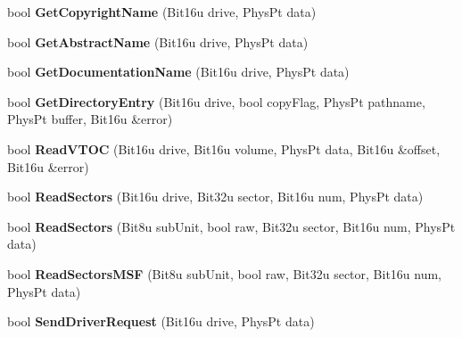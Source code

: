\begin{DoxyCompactItemize}
\item 
\hypertarget{classCMscdex_a359564a146117131092365623502a426}{bool {\bfseries Get\-Copyright\-Name} (Bit16u drive, Phys\-Pt data)}\label{classCMscdex_a359564a146117131092365623502a426}

\item 
\hypertarget{classCMscdex_a5a813cad2785de864459f65a49f4b146}{bool {\bfseries Get\-Abstract\-Name} (Bit16u drive, Phys\-Pt data)}\label{classCMscdex_a5a813cad2785de864459f65a49f4b146}

\item 
\hypertarget{classCMscdex_ae6209fad7716e1261f4ed7a15fe64026}{bool {\bfseries Get\-Documentation\-Name} (Bit16u drive, Phys\-Pt data)}\label{classCMscdex_ae6209fad7716e1261f4ed7a15fe64026}

\item 
\hypertarget{classCMscdex_a7af859df94d70eea08c953571a54ed36}{bool {\bfseries Get\-Directory\-Entry} (Bit16u drive, bool copy\-Flag, Phys\-Pt pathname, Phys\-Pt buffer, Bit16u \&error)}\label{classCMscdex_a7af859df94d70eea08c953571a54ed36}

\item 
\hypertarget{classCMscdex_ad0746c59d6eaee8c20d5267bec58a09b}{bool {\bfseries Read\-V\-T\-O\-C} (Bit16u drive, Bit16u volume, Phys\-Pt data, Bit16u \&offset, Bit16u \&error)}\label{classCMscdex_ad0746c59d6eaee8c20d5267bec58a09b}

\item 
\hypertarget{classCMscdex_ac97e8044bbe54cd19c9b1ffd2dcdb23b}{bool {\bfseries Read\-Sectors} (Bit16u drive, Bit32u sector, Bit16u num, Phys\-Pt data)}\label{classCMscdex_ac97e8044bbe54cd19c9b1ffd2dcdb23b}

\item 
\hypertarget{classCMscdex_a41e035bc2ef5add4d2d5e4b3cdb01178}{bool {\bfseries Read\-Sectors} (Bit8u sub\-Unit, bool raw, Bit32u sector, Bit16u num, Phys\-Pt data)}\label{classCMscdex_a41e035bc2ef5add4d2d5e4b3cdb01178}

\item 
\hypertarget{classCMscdex_a4968600c46a71d883d6709fe25ca903c}{bool {\bfseries Read\-Sectors\-M\-S\-F} (Bit8u sub\-Unit, bool raw, Bit32u sector, Bit16u num, Phys\-Pt data)}\label{classCMscdex_a4968600c46a71d883d6709fe25ca903c}

\item 
\hypertarget{classCMscdex_a2ab48935a7a8fd4292f3028243ab2b66}{bool {\bfseries Send\-Driver\-Request} (Bit16u drive, Phys\-Pt data)}\label{classCMscdex_a2ab48935a7a8fd4292f3028243ab2b66}


\end{DoxyCompactItemize}
